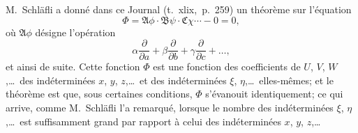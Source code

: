 \documentclass[11pt,a4paper]{book}
\begin{document}
\medskip

\textsc{M.}~Schl\"afli a donn\'e dans ce Journal (t.\ xlix,\ p.\ 259) un
th\'eor\`eme sur l'\'equation
\[
\Phi = \mathfrak{A}\phi \cdot \mathfrak{B}\psi \cdot \mathfrak{C}\chi \cdots - 0 = 0,
\]
o\`u $\mathfrak{A}\phi$ d\'esigne l'op\'eration
\[
\alpha\frac{\partial}{\partial a}
+ \beta\frac{\partial}{\partial b}
+ \gamma\frac{\partial}{\partial c} + \ldots,
\]
et ainsi de suite. Cette fonction $\Phi$ est une fonction des coefficients
de $U$, $V$, $W$,\ldots\ des ind\'etermin\'ees $x$, $y$, $z$,\ldots\ et des
ind\'etermin\'ees $\xi$, $\eta$,\ldots\ elles-m\^emes; et le th\'eor\`eme est
que, sous certaines conditions, $\Phi$ s'\'evanouit identiquement; ce qui
arrive, comme M.~Schl\"afli l'a remarqu\'e, lorsque le nombre des
ind\'etermin\'ees $\xi$, $\eta$,\ldots\ est suffisamment grand par rapport \`a
celui des ind\'etermin\'ees $x$, $y$, $z$,\ldots
\end{document}
